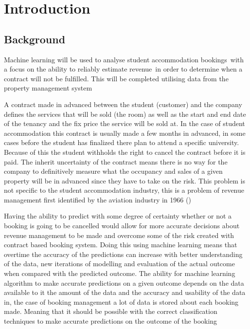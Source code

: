 \chapter{Introduction}

\section{Background}

Machine learning will be used to analyse student accommodation bookings with a focus on the ability to reliably estimate revenue in order to determine when a contract will not be fulfilled. This will be completed utilising data from the property management system \cite{}

\vspace{5mm}

A contract made in advanced between the student (customer) and the company defines the services that will be sold (the room) as well as the start and end date of the tenancy and the fix price the service will be sold at. In the case of student accommodation this contract is usually made a few months in advanced, in some cases before the student has finalized there plan to attend a specific university. Because of this the student withholds the right to cancel the contract before it is paid. The inherit uncertainty of the contract means there is no way for the company to definitively measure what the occupancy and sales of a given property will be in advanced since they have to take on the risk. This problem is not specific to the student accommodation industry, this is a problem of revenue management first identified by the aviation industry in 1966  (\cite{Chiang2007AnResearch})

\vspace{5mm}


Having the ability to predict with some degree of certainty whether or not a booking is going to be cancelled would allow for more accurate decisions about revenue management to be made and overcome some of the risk created with contract based booking system. Doing this using machine learning means that overtime the accuracy of the predictions can increase with better understanding of the data, new iterations of modelling and evaluation of the actual outcome when compared with the predicted outcome. The ability for machine learning algorithm to make accurate predictions on a given outcome depends on the data available to it the amount of the data and the accuracy and usability of the data in, the case of booking management a lot of data is stored about each booking made. Meaning that it should be possible with the correct classification techniques to make accurate predictions on the outcome of the booking



